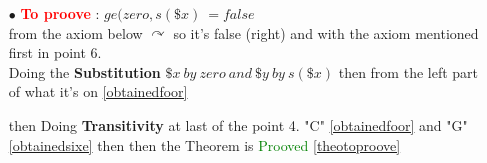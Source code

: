 \begin{enumerate}
\begin{itemize}
\item[$\bullet$]\textcolor{red}{\textbf{To proove}} : $ge(zero,s(\$x)\ = false$ \\
from the axiom below $\curvearrowright$ 
so it's false (right) \checkmark and with the axiom mentioned first in point 6. \\ Doing the \textbf{Substitution} $\$x\ by\ zero\ and\ \$y\ by\ s(\$x) $ then from the left part of what it's on \ref{obtainedfoor}  \label{obtainedsixe}

\item[] then Doing \textbf{Transitivity} at last of the point 4. "C" \ref{obtainedfoor} and "G" \ref{obtainedsixe} then
 \label{obtainedg} then the Theorem is \textcolor{green}{Prooved} \ref{theotoproove}





\end{itemize}
\end{enumerate}

